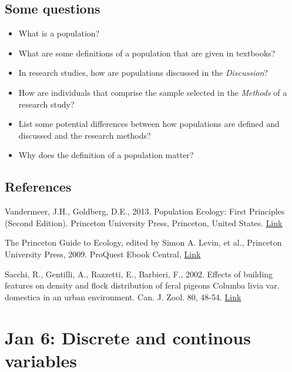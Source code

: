 \documentclass[
]{book}
\providecommand{\tightlist}{%
  \setlength{\itemsep}{0pt}\setlength{\parskip}{0pt}}
\begin{document}
\hypertarget{some-questions}{%
\section{Some questions}\label{some-questions}}

\begin{itemize}
\tightlist
\item
  What is a population?
\item
  What are some definitions of a population that are given in textbooks?
\item
  In research studies, how are populations discussed in the \emph{Discussion}?
\item
  How are individuals that comprise the sample selected in the \emph{Methods} of a research study?
\item
  List some potential differences between how populations are defined and discussed and the research methods?
\item
  Why does the definition of a population matter?
\end{itemize}

\hypertarget{references}{%
\section{References}\label{references}}

Vandermeer, J.H., Goldberg, D.E., 2013. Population Ecology: First Principles (Second Edition). Princeton University Press, Princeton, United States. \href{https://ebookcentral-proquest-com.qe2a-proxy.mun.ca/lib/mun/detail.action?docID=1205619}{Link}

The Princeton Guide to Ecology, edited by Simon A. Levin, et al., Princeton University Press, 2009. ProQuest Ebook Central, \href{https://ebookcentral-proquest-com.qe2a-proxy.mun.ca/lib/mun/detail.action?docID=557123}{Link}

Sacchi, R., Gentilli, A., Razzetti, E., Barbieri, F., 2002. Effects of building features on density and flock distribution of feral pigeons Columba livia var. domestica in an urban environment. Can. J. Zool. 80, 48-54. \href{https://cdnsciencepub.com/doi/10.1139/z01-202}{Link}

\hypertarget{jan-6-discrete-and-continous-variables}{%
\chapter{Jan 6: Discrete and continous variables}\label{jan-6-discrete-and-continous-variables}}
\end{document}
